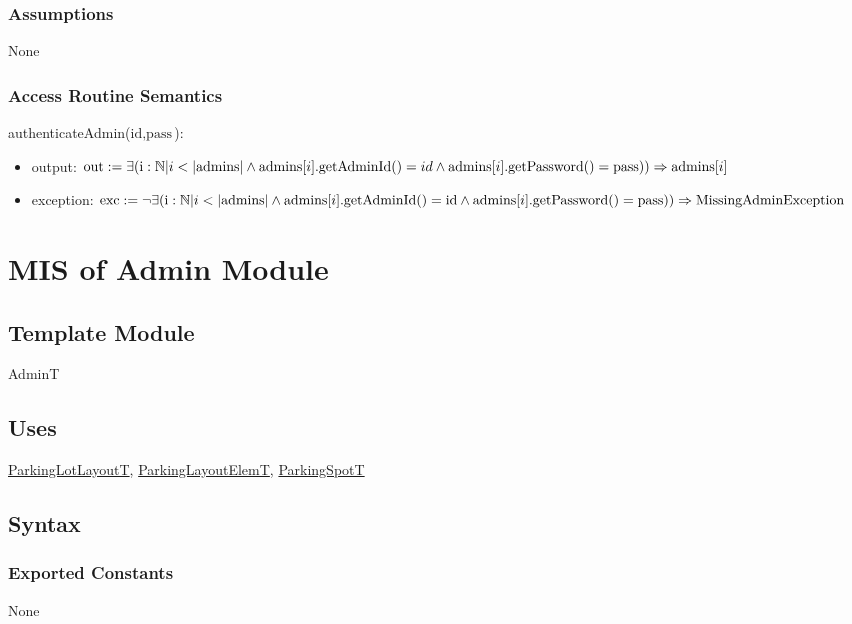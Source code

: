 \documentclass[12pt, titlepage]{article}
\begin{document}
\subsubsection{Assumptions}
None

\subsubsection{Access Routine Semantics}

\noindent authenticateAdmin($\text{id}, \text{pass}$):
\begin{itemize}
\item output: $\text{out} := \exists (\text{i} : \mathbb{N} | i <
|\text{admins}| \land \text{admins}[i].\text{getAdminId}() = id \land \\
\text{admins}[i].\text{getPassword}() = \text{pass})) \Rightarrow
\text{admins}[i]$
\item exception: $\text{exc} := \neg \exists (\text{i} : \mathbb{N} | i <
|\text{admins}| \land \text{admins}[i].\text{getAdminId}() = \text{id} \land \\
\text{admins}[i].\text{getPassword}() = \text{pass})) \Rightarrow
\text{MissingAdminException}$
\end{itemize}

\newpage

\section{MIS of Admin Module} 
\label{admin:Module}

\subsection{Template Module}
AdminT

\subsection{Uses}
\hyperref[parkingLotLayout:Module]{ParkingLotLayoutT},
\hyperref[parkingLayoutElem:Module]{ParkingLayoutElemT}, 
\hyperref[parkingSpot:Module]{ParkingSpotT}

\subsection{Syntax}

\subsubsection{Exported Constants}
None
\end{document}
